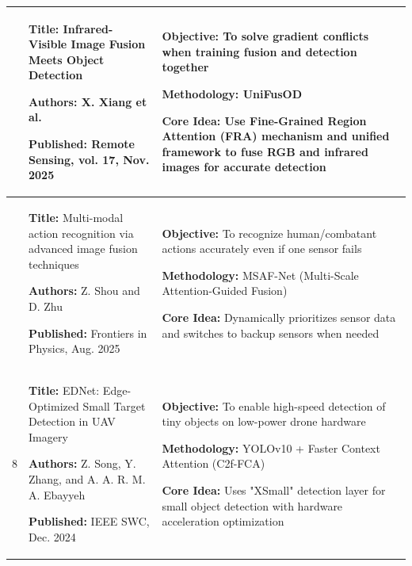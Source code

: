 \begin{center}
\begin{longtable}{
        |>{\centering\arraybackslash}m{1.22cm}
        |>{\raggedright\arraybackslash}m{6.3cm}
        |>{\raggedright\arraybackslash}m{6.3cm}|
        }
        6                                                                                            &
        \textbf{Title:} Infrared-Visible Image Fusion Meets Object Detection \par
        \textbf{Authors:} X. Xiang et al. \par
        \textbf{Published:} Remote Sensing, vol. 17, Nov.
        2025                                                                                         &
        \textbf{Objective:} To solve gradient conflicts when training fusion and detection together \par
        \textbf{Methodology:} UniFusOD \par
        \textbf{Core Idea:} Use Fine-Grained Region Attention (FRA) mechanism and unified framework to fuse RGB and infrared images for accurate detection                                 \\
        \hline

        7                                                                                            &
        \textbf{Title:} Multi-modal action recognition via advanced image fusion techniques \par
        \textbf{Authors:} Z. Shou and D. Zhu \par
        \textbf{Published:} Frontiers in Physics, Aug. 2025                                          &
        \textbf{Objective:} To recognize human/combatant actions accurately even if one sensor fails \par
        \textbf{Methodology:} MSAF-Net (Multi-Scale Attention-Guided Fusion) \par
        \textbf{Core Idea:} Dynamically prioritizes sensor data and switches to backup sensors when needed                                                                                 \\
        \hline

        8                                                                                            &
        \textbf{Title:} EDNet: Edge-Optimized Small Target Detection in UAV Imagery \par
        \textbf{Authors:} Z. Song, Y. Zhang, and A. A. R. M. A. Ebayyeh \par
        \textbf{Published:} IEEE SWC, Dec. 2024                                                      &
        \textbf{Objective:} To enable high-speed detection of tiny objects on low-power drone hardware \par
        \textbf{Methodology:} YOLOv10 + Faster Context Attention (C2f-FCA) \par
        \textbf{Core Idea:} Uses "XSmall" detection layer for small object detection with hardware acceleration optimization                                                               \\
        \hline


\end{longtable}
\end{center}
